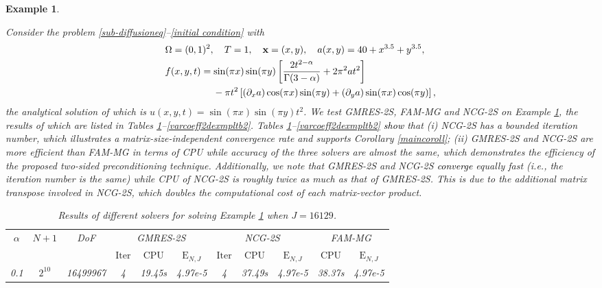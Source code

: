 \documentclass[11pt]{article}%
\numberwithin{equation}{section}
\newtheorem{example}{Example}
\begin{document}
\begin{example}\label{varcoeff2dexmpl}
	{\rm
		Consider the problem \eqref{sub-diffusioneq}--\eqref{initial condition} with
		\begin{align*}
		&\Omega=(0,1)^2,\quad T=1,\quad{\bf x}=(x,y),\quad a(x,y)=40+x^{3.5}+y^{3.5},\\
		& f(x,y,t)=\sin(\pi x)\sin(\pi y)\left[\frac{2t^{2-\alpha}}{\Gamma(3-\alpha)}+2\pi^2at^2\right]\\
		&\qquad\qquad\quad-\pi t^2\left[(\partial_xa)\cos(\pi x)\sin(\pi y)+(\partial_ya)\sin(\pi x)\cos(\pi y)\right],
		\end{align*}
		the analytical solution of which is $u(x,y,t)=\sin(\pi x)\sin(\pi y)t^2$.
		We test GMRES-2S, FAM-MG and NCG-2S on Example \ref{varcoeff2dexmpl}, the results of which are listed in Tables \ref{varcoeff2dexmpltb1}--\ref{varcoeff2dexmpltb2}. Tables \ref{varcoeff2dexmpltb1}--\ref{varcoeff2dexmpltb2} \textcolor{black}{show} that (i) NCG-2S has a bounded iteration number, which illustrates a matrix-size-independent convergence rate and supports Corollary \ref{maincoroll}; (ii) GMRES-2S and NCG-2S are more efficient than FAM-MG in terms of CPU while accuracy of the three solvers are almost the same, which demonstrates the efficiency of the proposed two-sided preconditioning technique. Additionally, we note that GMRES-2S and NCG-2S \textcolor{black}{converge} equally fast (i.e., the iteration number is the same) while CPU of NCG-2S is roughly twice as much as that of GMRES-2S. This is due to the additional matrix transpose involved in NCG-2S, which doubles the computational cost of each matrix-vector product.
		\begin{table}[H]
			\begin{center}
				\caption{Results of different solvers for solving Example \ref{varcoeff2dexmpl} when  $J=16129$.}\label{varcoeff2dexmpltb1}
				\setlength{\tabcolsep}{0.48em}
				\begin{tabular}[c]{ccc|ccc|ccc|cc}
					\hline
					\multirow{2}{*}{$\alpha$} &\multirow{2}{*}{$N+1$} &\multirow{2}{*}{DoF}& \multicolumn{3}{c|}{GMRES-2S}   &\multicolumn{3}{c|}{NCG-2S}& \multicolumn{2}{c}{FAM-MG}\\
					\cline{4-11}
					&&&$\mathrm{Iter}$&$\mathrm{CPU}$&$\mathrm{E}_{N,J}$&$\mathrm{Iter}$&$\mathrm{CPU}$&$\mathrm{E}_{N,J}$&$\mathrm{CPU}$&$\mathrm{E}_{N,J}$\\
					\hline
					\multirow{4}{*}{0.1} 
					&$2^{10}$ &16499967 &4   &19.45s  &4.97e-5 &4   &37.49s   &4.97e-5&38.37s &4.97e-5 \\

\end{tabular}
\end{center}
\end{table}}
\end{example}
\end{document}
